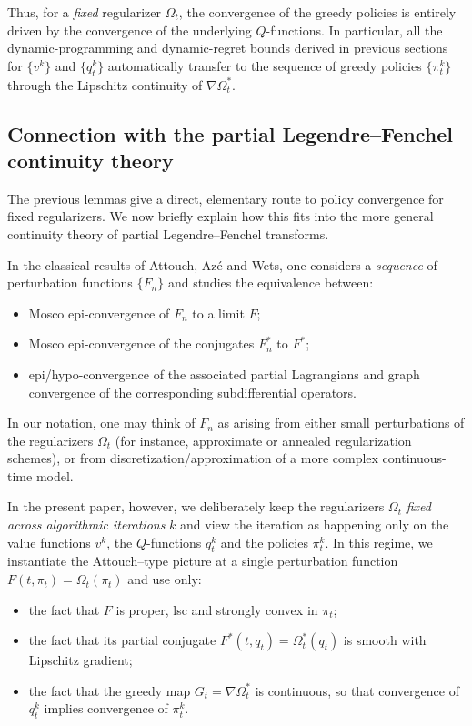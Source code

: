 \documentclass{article}
\theoremstyle{plain}
\theoremstyle{definition}
\theoremstyle{remark}
\newcommand{\1}{\mathbbm{1}}
\begin{document}
Thus, for a \emph{fixed} regularizer $\Omega_t$, the convergence of the greedy policies is entirely driven by the convergence of the underlying $Q$-functions. In particular, all the dynamic-programming and dynamic-regret bounds derived in previous sections for $\{v^k\}$ and $\{q_t^k\}$ automatically transfer to the sequence of greedy policies $\{\pi_t^k\}$ through the Lipschitz continuity of $\nabla \Omega_t^*$.

\subsection{Connection with the partial Legendre--Fenchel continuity theory}

The previous lemmas give a direct, elementary route to policy convergence for fixed regularizers. We now briefly explain how this fits into the more general continuity theory of partial Legendre--Fenchel transforms.

In the classical results of Attouch, Azé and Wets, one considers a \emph{sequence} of perturbation functions $\{F_n\}$ and studies the equivalence between:
\begin{itemize}
  \item Mosco epi-convergence of $F_n$ to a limit $F$;
  \item Mosco epi-convergence of the conjugates $F_n^*$ to $F^*$;
  \item epi/hypo-convergence of the associated partial Lagrangians and graph convergence of the corresponding subdifferential operators.
\end{itemize}
In our notation, one may think of $F_n$ as arising from either small perturbations of the regularizers $\Omega_t$ (for instance, approximate or annealed regularization schemes), or from discretization/approximation of a more complex continuous-time model.

In the present paper, however, we deliberately keep the regularizers $\Omega_t$ \emph{fixed across algorithmic iterations} $k$ and view the iteration as happening only on the value functions $v^k$, the $Q$-functions $q_t^k$ and the policies $\pi_t^k$. In this regime, we instantiate the Attouch--type picture at a single perturbation function $F(t,\pi_t)=\Omega_t(\pi_t)$ and use only:
\begin{itemize}
  \item the fact that $F$ is proper, lsc and strongly convex in $\pi_t$;
  \item the fact that its partial conjugate $F^*(t,q_t)=\Omega_t^*(q_t)$ is smooth with Lipschitz gradient;
  \item the fact that the greedy map $G_t=\nabla \Omega_t^*$ is continuous, so that convergence of $q_t^k$ implies convergence of $\pi_t^k$.
\end{itemize}
\end{document}

